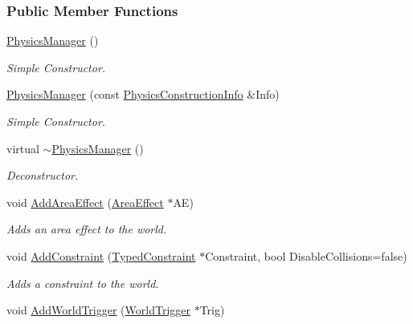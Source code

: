 \subsubsection*{Public Member Functions}
\begin{DoxyCompactItemize}
\item 
\hyperlink{classMezzanine_1_1PhysicsManager_af734a8d307507e261995a838a0ad0dfb}{PhysicsManager} ()
\begin{DoxyCompactList}\small\item\em Simple Constructor. \item\end{DoxyCompactList}\item 
\hyperlink{classMezzanine_1_1PhysicsManager_a0fe5d7e0c4ce3eac834478862cef73b1}{PhysicsManager} (const \hyperlink{classMezzanine_1_1PhysicsConstructionInfo}{PhysicsConstructionInfo} \&Info)
\begin{DoxyCompactList}\small\item\em Simple Constructor. \item\end{DoxyCompactList}\item 
virtual \hyperlink{classMezzanine_1_1PhysicsManager_a1d265da29c5a4030a3f6ad97f5027709}{$\sim$PhysicsManager} ()
\begin{DoxyCompactList}\small\item\em Deconstructor. \item\end{DoxyCompactList}\item 
void \hyperlink{classMezzanine_1_1PhysicsManager_a62c7bb223d2712a4f1806216429015a9}{AddAreaEffect} (\hyperlink{classMezzanine_1_1AreaEffect}{AreaEffect} $\ast$AE)
\begin{DoxyCompactList}\small\item\em Adds an area effect to the world. \item\end{DoxyCompactList}\item 
void \hyperlink{classMezzanine_1_1PhysicsManager_ae07ea8ae4877fcc3d0757e42d2726b65}{AddConstraint} (\hyperlink{classMezzanine_1_1TypedConstraint}{TypedConstraint} $\ast$Constraint, bool DisableCollisions=false)
\begin{DoxyCompactList}\small\item\em Adds a constraint to the world. \item\end{DoxyCompactList}\item 
void \hyperlink{classMezzanine_1_1PhysicsManager_a4dfbe87e03c09b1fcce946c9b9271fa6}{AddWorldTrigger} (\hyperlink{classMezzanine_1_1WorldTrigger}{WorldTrigger} $\ast$Trig)

\end{DoxyCompactItemize}
